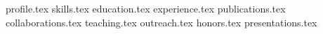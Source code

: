 \documentclass[11pt, a4paper]{awesome-cv}
\newcommand*{\sectiondir}{cv/}
\begin{document}
\makecvheader

{profile.tex} 
{skills.tex}
{education.tex} 
\clearpage
{experience.tex}
{publications.tex}
{collaborations.tex}
{teaching.tex}
\clearpage
{outreach.tex}
{honors.tex} 
{presentations.tex}
\end{document}
